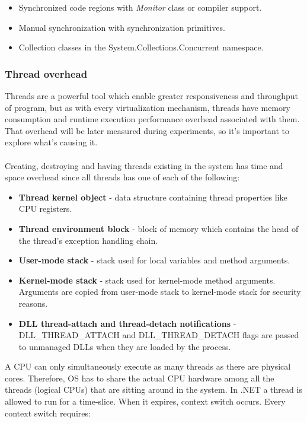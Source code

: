 \begin{itemize}
	\item Synchronized code regions with \emph{Monitor} class or compiler support.
	\item Manual synchronization with synchronization primitives.
	\item Collection classes in the System.Collections.Concurrent namespace. 
\end{itemize}

\subsubsection{Thread overhead}
Threads are a powerful tool which enable greater responsiveness and throughput of program, but as with every virtualization mechanism, threads have memory consumption and runtime execution performance overhead associated with them. That overhead will be later measured during experiments, so it's important to explore what's causing it. 
\\ \\
Creating, destroying and having threads existing in the system has time and space overhead since all threads has one of each of the following:
\begin{itemize}
	\item \textbf{Thread kernel object} -  data structure containing thread properties like CPU registers.
	\item \textbf{Thread environment block} -  block of memory which contains the head of the thread's exception handling chain.
	\item \textbf{User-mode stack} - stack used for local variables and method arguments.
	\item \textbf{Kernel-mode stack} - stack used for kernel-mode method arguments. Arguments are copied from user-mode stack to kernel-mode stack for security reasons.
	\item \textbf{DLL thread-attach and thread-detach notifications} - DLL\_THREAD\_ATTACH and DLL\_THREAD\_DETACH flags are passed to unmanaged DLLs when they are loaded by the process.
\end{itemize}

A CPU can only simultaneously execute as many threads as there are physical cores. Therefore, OS has to share the actual CPU hardware among all the threads (logical CPUs) that are sitting around in the system. In .NET a thread is allowed to run for a time-slice. When it expires, context switch occurs. Every context switch requires:

